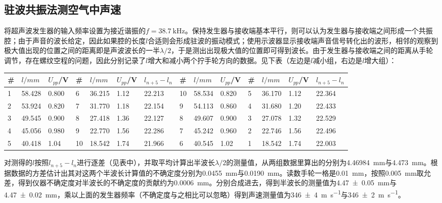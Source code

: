 \documentclass[UTF8]{ctexart}
\begin{document}
\subsection{驻波共振法测空气中声速}
将超声波发生器的输入频率设置为接近谐振的$f=\SI{38.7}{\kHz}$。保持发生器与接收端基本平行，则可以认为发生器与接收端之间形成一个共振腔；由于声音的波长给定，因此如果腔的长度$l$合适则会形成驻波的振动模式；使用示波器显示接收端声音信号转化出的波形，相邻的观察到极大值出现的位置之间的距离即是声波波长的一半$\lambda/2$，于是测出出现极大值的位置即可得到波长。由于发生器与接收端之间的距离从手轮调节，存在螺纹空程的问题，因此分别记录了$l$增大和减小两个拧手轮方向的数据。见下表（左边是$l$减小组，右边是$l$增大组）：
\begin{center}
\begin{tabu}{X[c,-1]|X[c]X[c]|X[c,-1]|X[c]X[c]|X[c,-10]||X[c,-1]|X[c]X[c]|X[c,-1]|X[c]X[c]|X[c,-10]}
\hline
\#	&$l/\si{mm}$	&$U_{pp}$/V	&	\#	&$l/\si{mm}$	&$U_{pp}$/V	&$l_{n+5}-l_n$&\#	&$l/\si{mm}$	&$U_{pp}$/V	&	\#	&$l/\si{mm}$	&$U_{pp}$/V	&$l_{n+5}-l_n$\\
	&	58.428	&	0.800	&	6	&	36.215	&	1.12	&22.213	&		10	&	58.534	&	0.820	&	5	&	36.170	&	1.12	&	22.364\\
2	&	53.924	&	0.820	&	7	&	31.770	&	1.18	&22.154	&		9	&	54.113	&	0.860	&	4	&	31.680	&	1.20	&	22.433\\
3	&	49.545	&	0.900	&	8	&	27.418	&	1.36	&22.127	&		8	&	49.607	&	0.900	&	3	&	27.078	&	1.32	&	22.529\\
4	&	45.056	&	0.980	&	9	&	22.770	&	1.56	&22.286	&		7	&	45.242	&	0.960	&	2	&	22.746	&	1.56	&	22.496\\
5	&	40.418	&	1.04	&	10	&	18.542	&	1.74	&21.966	&		6	&	40.545	&	1.02	&	1	&	18.542	&	1.74	&	22.003\\
\hline
\end{tabu}
\end{center}
对测得的$l$按照$l_{n+5}-l_n$进行逐差（见表中），并取平均计算出半波长$\lambda/2$的测量值，从两组数据里算出的分别为\SI{4.46984}{\mm}与\SI{4.473}{\mm}。根据数据的方差估计出其对这两个半波长计算值的不确定度分别为\SI{0.0455}{\mm}与\SI{0.0190}{\mm}。读数手轮一格是\SI{.01}{\mm}，按照\SI{.005}{\mm}取允差，得到仪器不确定度对半波长的不确定度的贡献约为\SI{.0006}{\mm}。分别合成进去，得到半波长的测量值为\SI{4.47(5)}{\mm}与\SI{4.47(2)}{\mm}，乘以上面的发生器频率（不确定度与之相比可以忽略）得到声速测量值为\SI{346(4)}{\meter\per\second}与\SI{346(2)}{\meter\per\second}。
\end{document}
